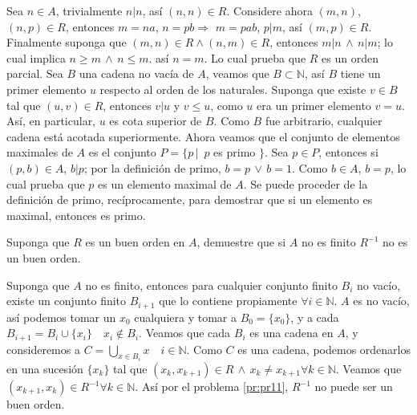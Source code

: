 \begin{sol}
    Sea $n \in A$, trivialmente $n | n$, así $(n,n) \in R$. Considere
    ahora $(m,n)$, $(n,p) \in R$, entonces $m=na$, $n=pb$$\Rightarrow$
    $m=pab$, $p | m$, así $(m,p) \in R$. Finalmente suponga que $(m,n) \in R
    \land (n,m) \in R$, entonces $m | n \,\land \, n | m$; lo cual implica
    $n \geq m \, \land \, n \leq m$. así $n=m$. Lo cual prueba que $R$ es un
    orden parcial. 
    Sea $B$ una cadena no vacía de $A$, veamos que $B \subset \mathbb{N}$,
    así $B$ tiene un primer elemento $u$ respecto al orden de los naturales.
    Suponga que existe $v \in B$ tal que $(u,v)\in R$, entonces $v | u$ y $v
    \leq u$, como $u$ era un primer elemento $v=u$. Así, en particular, $u$
    es cota superior de $B$. Como $B$ fue arbitrario, cualquier cadena está
    acotada superiormente. Ahora veamos que el conjunto de elementos
    maximales de $A$ es el conjunto $P=\{p \, | \,$ $p$ es primo $\}$. Sea
    $p \in P$, entonces si $(p,b) \in A$, $b | p$; por la definición de
    primo, $b=p \, \lor \, b=1$. Como $b \in A$, $b =p$, lo cual prueba que
    $p$ es un elemento maximal de $A$. Se puede proceder de la definición de
    primo, recíprocamente, para demostrar que si un elemento es maximal,
    entonces es primo.
\end{sol}
\begin{problem}
    Suponga que $R$ es un buen orden en $A$, demuestre que si $A$ no es
    finito $R^{-1}$ no es un buen orden.
\end{problem}
\begin{sol}
    Suponga que $A$ no es finito, entonces para cualquier conjunto finito
    $B_i$ no vacío, existe un conjunto finito $B_{i+1}$ que lo contiene
    propiamente $\forall i \in \mathbb{N}$. $A$ es no vacío, así podemos
    tomar un $x_0$ cualquiera y tomar a $B_0= \{x_0\}$, y a cada
    $B_{i+1}=B_i \cup \{x_i\} \quad x_i\notin B_i$. Veamos que cada $B_i$ es
    una cadena en $A$, y consideremos a $C=\bigcup\limits_{x \in B_i} x
    \quad i \in \mathbb{N}$. Como $C$ es una cadena, podemos ordenarlos en
    una sucesión $\{x_k\}$ tal que $(x_k,x_{k+1}) \in R\, \land \, x_k \neq
    x_{k+1} \forall k \in \mathbb{N}$. Veamos que $(x_{k+1}, x_k)\in R^{-1} \forall k
    \in \mathbb{N}$. Así por el problema \ref{pr:pr11}, $R^{-1}$ no puede
    ser un buen orden.
\end{sol}
